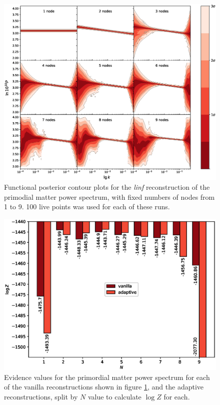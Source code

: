 \documentclass{article}
\begin{document}
\newpage

\begin{figure}[H]
  \centering
  \includegraphics[width=16cm]{vanilla100.eps}
  \caption{Functional posterior contour plots for the \textit{linf} reconstruction of the primodial matter power spectrum, with fixed numbers of nodes from 1 to 9. 100 live points was used for each of these runs.}
  \label{fig:Pk_vanilla_100}
\end{figure}

\newpage

\begin{figure}[H]
  \centering
  \includegraphics[width=13cm]{PklogZ.eps}
  \caption{Evidence values for the primordial matter power spectrum for each of the vanilla reconstructions shown in figure \ref{fig:Pk_vanilla_100}, and the adaptive reconstructions, split by $N$ value to calculate $\log{Z}$ for each.}
  \label{fig:PklogZ}
\end{figure}
\end{document}
